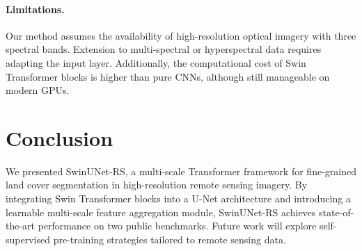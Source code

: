 \documentclass[conference]{IEEEtran}
\begin{document}
\paragraph{Limitations.}
Our method assumes the availability of high-resolution optical imagery with three spectral bands.
Extension to multi-spectral or hyperspectral data requires adapting the input layer.
Additionally, the computational cost of Swin Transformer blocks is higher than pure CNNs,
although still manageable on modern GPUs.

\section{Conclusion}\label{sec:conclusion}

We presented SwinUNet-RS, a multi-scale Transformer framework for fine-grained land cover
segmentation in high-resolution remote sensing imagery. By integrating Swin Transformer blocks
into a U-Net architecture and introducing a learnable multi-scale feature aggregation module,
SwinUNet-RS achieves state-of-the-art performance on two public benchmarks.
Future work will explore self-supervised pre-training strategies tailored to remote sensing data.



\end{document}
